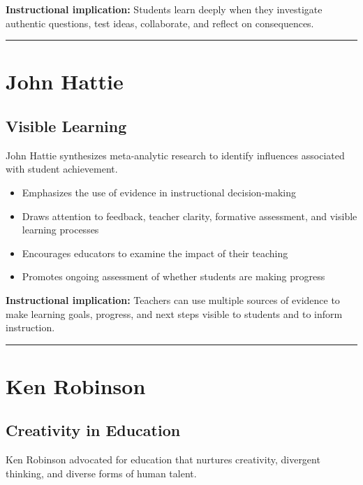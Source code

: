 \documentclass[
  letterpaper,
  DIV=11,
  numbers=noendperiod]{scrartcl}
\providecommand{\tightlist}{%
  \setlength{\itemsep}{0pt}\setlength{\parskip}{0pt}}\usepackage{longtable,booktabs,array}
\begin{document}
\textbf{Instructional implication:} Students learn deeply when they
investigate authentic questions, test ideas, collaborate, and reflect on
consequences.

\begin{center}\rule{0.5\linewidth}{0.5pt}\end{center}

\section{John Hattie}\label{john-hattie}

\subsection{Visible Learning}\label{visible-learning}

John Hattie synthesizes meta-analytic research to identify influences
associated with student achievement.

\begin{itemize}
\tightlist
\item
  Emphasizes the use of evidence in instructional decision-making
\item
  Draws attention to feedback, teacher clarity, formative assessment,
  and visible learning processes
\item
  Encourages educators to examine the impact of their teaching
\item
  Promotes ongoing assessment of whether students are making progress
\end{itemize}

\textbf{Instructional implication:} Teachers can use multiple sources of
evidence to make learning goals, progress, and next steps visible to
students and to inform instruction.

\begin{center}\rule{0.5\linewidth}{0.5pt}\end{center}

\section{Ken Robinson}\label{ken-robinson}

\subsection{Creativity in Education}\label{creativity-in-education}

Ken Robinson advocated for education that nurtures creativity, divergent
thinking, and diverse forms of human talent.
\end{document}
